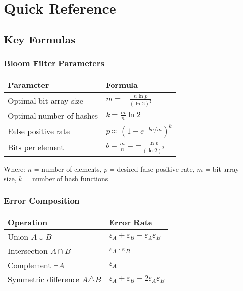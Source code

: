 \chapter{Quick Reference}
\label{app:quick-reference}

\section{Key Formulas}

\subsection{Bloom Filter Parameters}

\begin{center}
\begin{tabular}{|l|l|}
\hline
\textbf{Parameter} & \textbf{Formula} \\
\hline
Optimal bit array size & $m = -\frac{n \ln p}{(\ln 2)^2}$ \\
Optimal number of hashes & $k = \frac{m}{n} \ln 2$ \\
False positive rate & $p \approx \left(1 - e^{-kn/m}\right)^k$ \\
Bits per element & $b = \frac{m}{n} = -\frac{\ln p}{(\ln 2)^2}$ \\
\hline
\end{tabular}
\end{center}

Where: $n$ = number of elements, $p$ = desired false positive rate, $m$ = bit array size, $k$ = number of hash functions

\subsection{Error Composition}

\begin{center}
\begin{tabular}{|l|l|}
\hline
\textbf{Operation} & \textbf{Error Rate} \\
\hline
Union $A \cup B$ & $\varepsilon_A + \varepsilon_B - \varepsilon_A \varepsilon_B$ \\
Intersection $A \cap B$ & $\varepsilon_A \cdot \varepsilon_B$ \\
Complement $\neg A$ & $\varepsilon_A$ \\
Symmetric difference $A \triangle B$ & $\varepsilon_A + \varepsilon_B - 2\varepsilon_A \varepsilon_B$ \\
\hline
\end{tabular}
\end{center}

